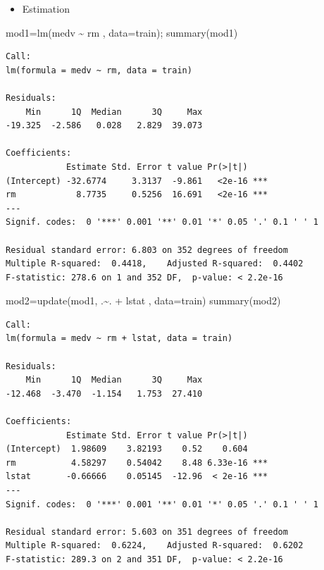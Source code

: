 \documentclass[
  8pt,
  ignorenonframetext,
]{beamer}
\newenvironment{Shaded}{\begin{snugshade}}{\end{snugshade}}
\newcommand{\AttributeTok}[1]{\textcolor[rgb]{0.77,0.63,0.00}{#1}}
\newcommand{\FunctionTok}[1]{\textcolor[rgb]{0.00,0.00,0.00}{#1}}
\newcommand{\NormalTok}[1]{#1}
\newcommand{\OtherTok}[1]{\textcolor[rgb]{0.56,0.35,0.01}{#1}}
\newcommand{\SpecialCharTok}[1]{\textcolor[rgb]{0.00,0.00,0.00}{#1}}
\providecommand{\tightlist}{%
  \setlength{\itemsep}{0pt}\setlength{\parskip}{0pt}}
\begin{document}
\begin{frame}[fragile]
\begin{itemize}
\tightlist
\item
  Estimation
\end{itemize}

\footnotesize

\begin{Shaded}
\begin{Highlighting}[]
\NormalTok{mod1}\OtherTok{=}\FunctionTok{lm}\NormalTok{(medv }\SpecialCharTok{\textasciitilde{}}\NormalTok{ rm , }\AttributeTok{data=}\NormalTok{train); }\FunctionTok{summary}\NormalTok{(mod1)}
\end{Highlighting}
\end{Shaded}

\begin{verbatim}
Call:
lm(formula = medv ~ rm, data = train)

Residuals:
    Min      1Q  Median      3Q     Max 
-19.325  -2.586   0.028   2.829  39.073 

Coefficients:
            Estimate Std. Error t value Pr(>|t|)    
(Intercept) -32.6774     3.3137  -9.861   <2e-16 ***
rm            8.7735     0.5256  16.691   <2e-16 ***
---
Signif. codes:  0 '***' 0.001 '**' 0.01 '*' 0.05 '.' 0.1 ' ' 1

Residual standard error: 6.803 on 352 degrees of freedom
Multiple R-squared:  0.4418,    Adjusted R-squared:  0.4402 
F-statistic: 278.6 on 1 and 352 DF,  p-value: < 2.2e-16
\end{verbatim}

\normalsize
\end{frame}

\begin{frame}[fragile]
\footnotesize

\begin{Shaded}
\begin{Highlighting}[]
\NormalTok{mod2}\OtherTok{=}\FunctionTok{update}\NormalTok{(mod1, .}\SpecialCharTok{\textasciitilde{}}\NormalTok{. }\SpecialCharTok{+}\NormalTok{ lstat , }\AttributeTok{data=}\NormalTok{train)}
\FunctionTok{summary}\NormalTok{(mod2)}
\end{Highlighting}
\end{Shaded}

\begin{verbatim}
Call:
lm(formula = medv ~ rm + lstat, data = train)

Residuals:
    Min      1Q  Median      3Q     Max 
-12.468  -3.470  -1.154   1.753  27.410 

Coefficients:
            Estimate Std. Error t value Pr(>|t|)    
(Intercept)  1.98609    3.82193    0.52    0.604    
rm           4.58297    0.54042    8.48 6.33e-16 ***
lstat       -0.66666    0.05145  -12.96  < 2e-16 ***
---
Signif. codes:  0 '***' 0.001 '**' 0.01 '*' 0.05 '.' 0.1 ' ' 1

Residual standard error: 5.603 on 351 degrees of freedom
Multiple R-squared:  0.6224,    Adjusted R-squared:  0.6202 
F-statistic: 289.3 on 2 and 351 DF,  p-value: < 2.2e-16
\end{verbatim}

\normalsize
\end{frame}
\end{document}
